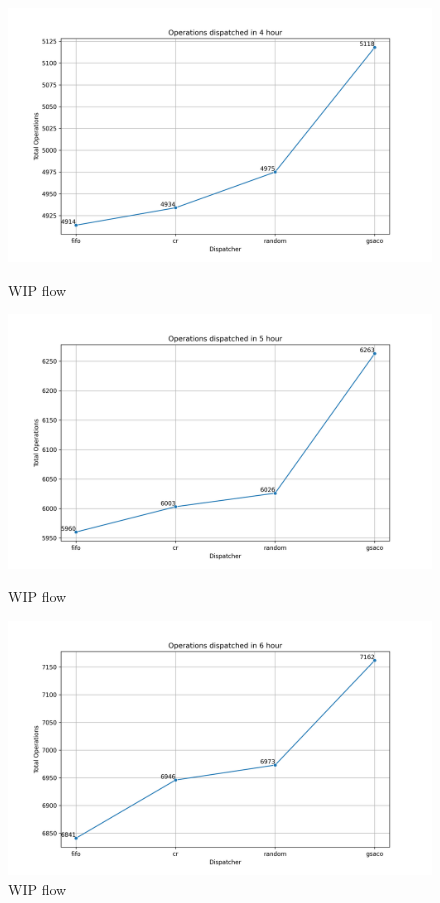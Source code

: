 \documentclass[runningheads]{llncs}
\begin{document}
\begin{figure}[t]
	\centering
	\begin{minipage}{0.32\textwidth}
		\includegraphics[width=\textwidth]{total_operations_14400s.png}
		\caption{WIP flow}
		\label{fig:o4}
	\end{minipage}\hfill
	\begin{minipage}{0.32\textwidth}
		\includegraphics[width=\textwidth]{total_operations_18000s.png}
		\caption{WIP flow}
		\label{fig:o5}
	\end{minipage}\hfill
	\begin{minipage}{0.32\textwidth}
		\includegraphics[width=\textwidth]{total_operations_21600s.png}
		\caption{WIP flow}
		\label{fig:o6}
	\end{minipage}
\end{figure}
\end{document}
